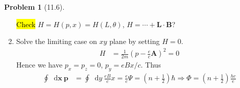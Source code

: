 \documentclass[twoside,11pt]{article}
\renewcommand*\d{\mathop{}\!\mathrm{d}}
\theoremstyle{definition}
\newtheorem{problem}{Problem}
\theoremstyle{remark}
\begin{document}
\begin{problem}[11.6]
\begin{enumerate}[label=(\alph*)]
\hl{Check} $H = H(p, x) = H(L, \theta)$, $H = \cdots + \mathbf{L}\cdot\mathbf{B}$?


\item Solve the limiting case on $xy$ plane by setting $H=0$.
\begin{align*}
    H &= \frac{1}{2m}\left(p - \frac{e}{c}\mathbf{A}\right)^2 = 0
\end{align*}
Hence we have $p_x=p_z=0$, $p_y=eBx/c$.
Thus
\begin{align*}
    \oint \d\mathbf{x}\ \mathbf{p} &= 
    \oint \d y\ \frac{eB}{c}x = \frac{e}{c}\Psi
    = \left(n+\frac{1}{2}\right)\hbar
    \Rightarrow \Phi = \left(n+\frac{1}{2}\right)\frac{hc}{e}
\end{align*}


\end{enumerate}
\end{problem}
\end{document}
